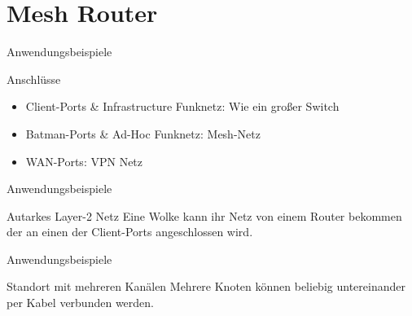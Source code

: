 \section{Mesh Router}

\begin{frame}{Anwendungsbeispiele}
    \begin{block}{Anschlüsse}
        \begin{itemize}
            \item Client-Ports \& Infrastructure Funknetz:
                Wie ein großer Switch
            \item Batman-Ports \& Ad-Hoc Funknetz:
                Mesh-Netz
            \item WAN-Ports:
                VPN Netz
        \end{itemize}
    \end{block}
\end{frame}

\begin{frame}{Anwendungsbeispiele}
    \begin{block}{Autarkes Layer-2 Netz}
        Eine Wolke kann ihr Netz von einem Router bekommen der an einen der
        Client-Ports angeschlossen wird.

    \end{block}
\end{frame}

\begin{frame}{Anwendungsbeispiele}
    \begin{block}{Standort mit mehreren Kanälen}
        Mehrere Knoten können beliebig untereinander per Kabel verbunden werden.

    \end{block}
\end{frame}



